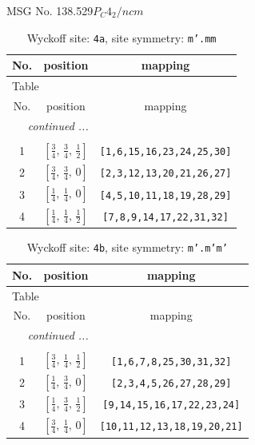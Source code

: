 \documentclass[fleqn,8pt]{jsarticle}
\begin{document}
\setcounter{MaxMatrixCols}{32}

\renewcommand{\tablename}{Table~}
\renewcommand{\figurename}{Figure~}
\begin{center}
\LARGE
MSG No. 138.529\quad$P_{C}4_{2}/ncm$
\end{center}
\renewcommand{\arraystretch}{1.2}
\begin{longtable}{ccc}
\caption{Wyckoff site: {\tt 4a}, site symmetry: {\tt m'.mm}}
 \\
 \hline \hline
No. & position & mapping \\ \hline \endfirsthead

\multicolumn{2}{l}{\tablename\ \thetable{}} \\
 \hline \hline
No. & position & mapping \\ \hline \endhead

 \hline \hline
\multicolumn{2}{r}{\footnotesize\it continued ...} \\ \endfoot

 \hline \hline
\multicolumn{2}{r}{} \\ \endlastfoot

1 & $\left[ \frac{3}{4},\, \frac{3}{4},\, \frac{1}{2} \right]$ & {\tt [1,6,15,16,23,24,25,30]} \\ \hline
2 & $\left[ \frac{3}{4},\, \frac{3}{4},\, 0 \right]$ & {\tt [2,3,12,13,20,21,26,27]} \\ \hline
3 & $\left[ \frac{1}{4},\, \frac{1}{4},\, 0 \right]$ & {\tt [4,5,10,11,18,19,28,29]} \\ \hline
4 & $\left[ \frac{1}{4},\, \frac{1}{4},\, \frac{1}{2} \right]$ & {\tt [7,8,9,14,17,22,31,32]} \\
\end{longtable}
\renewcommand{\arraystretch}{1.2}
\begin{longtable}{ccc}
\caption{Wyckoff site: {\tt 4b}, site symmetry: {\tt m'.m'm'}}
 \\
 \hline \hline
No. & position & mapping \\ \hline \endfirsthead

\multicolumn{2}{l}{\tablename\ \thetable{}} \\
 \hline \hline
No. & position & mapping \\ \hline \endhead

 \hline \hline
\multicolumn{2}{r}{\footnotesize\it continued ...} \\ \endfoot

 \hline \hline
\multicolumn{2}{r}{} \\ \endlastfoot

1 & $\left[ \frac{3}{4},\, \frac{1}{4},\, \frac{1}{2} \right]$ & {\tt [1,6,7,8,25,30,31,32]} \\ \hline
2 & $\left[ \frac{1}{4},\, \frac{3}{4},\, 0 \right]$ & {\tt [2,3,4,5,26,27,28,29]} \\ \hline
3 & $\left[ \frac{1}{4},\, \frac{3}{4},\, \frac{1}{2} \right]$ & {\tt [9,14,15,16,17,22,23,24]} \\ \hline
4 & $\left[ \frac{3}{4},\, \frac{1}{4},\, 0 \right]$ & {\tt [10,11,12,13,18,19,20,21]} \\
\end{longtable}
\end{document}
